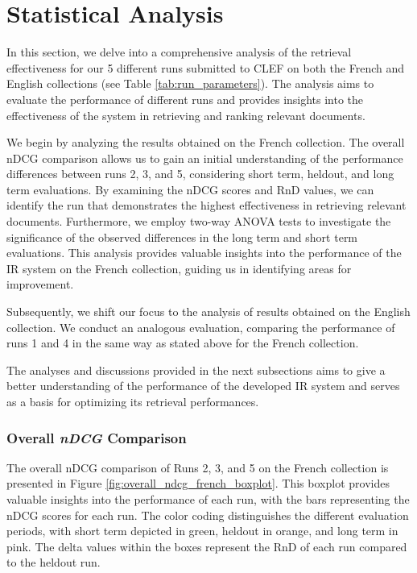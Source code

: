 \section{Statistical Analysis}
\label{sec:analysis}

In this section, we delve into a comprehensive analysis of the retrieval effectiveness for our 5 different runs submitted to \ac{CLEF} on both the French and English collections (see Table \ref{tab:run_parameters}). 
The analysis aims to evaluate the performance of different runs and provides insights into the effectiveness of the system in retrieving and ranking relevant documents.

We begin by analyzing the results obtained on the French collection. 
The overall \ac{nDCG} comparison allows us to gain an initial understanding of the performance differences between runs 2, 3, and 5, considering short term, heldout, and long term evaluations. 
By examining the \ac{nDCG} scores and \ac{RnD} values, we can identify the run that demonstrates the highest effectiveness in retrieving relevant documents. 
Furthermore, we employ two-way \ac{ANOVA} tests to investigate the significance of the observed differences in the long term and short term evaluations. 
This analysis provides valuable insights into the performance of the \ac{IR} system on the French collection, guiding us in identifying areas for improvement.

Subsequently, we shift our focus to the analysis of results obtained on the English collection. 
We conduct an analogous evaluation, comparing the performance of runs 1 and 4 in the same way as stated above for the French collection. 

The analyses and discussions provided in the next subsections aims to give a better understanding of the performance of the developed \ac{IR} system and serves as a basis for optimizing its retrieval performances.

\newpage
\subsubsection{Overall \textit{nDCG} Comparison}

The overall \ac{nDCG} comparison of Runs 2, 3, and 5 on the French collection is presented in Figure \ref{fig:overall_ndcg_french_boxplot}. 
This boxplot provides valuable insights into the performance of each run, with the bars representing the \ac{nDCG} scores for each run. 
The color coding distinguishes the different evaluation periods, with short term depicted in green, heldout in orange, and long term in pink. 
The delta values within the boxes represent the \ac{RnD} of each run compared to the heldout run.

